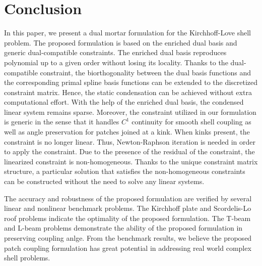 \section{Conclusion}\label{sec:conlusion}
In this paper, we present a dual mortar formulation for the Kirchhoff-Love shell problem. The proposed formulation is based on the enriched \Bezier dual basis and generic dual-compatible constraints. The enriched \Bezier dual basis reproduces polynomial up to a given order without losing its locality. Thanks to the dual-compatible constraint, the biorthogonality between the dual basis functions and the corresponding primal spline basis functions can be extended to the discretized constraint matrix. Hence, the static condensation can be achieved without extra computational effort. With the help of the enriched \Bezier dual basis, the condensed linear system remains sparse. Moreover, the constraint utilized in our formulation is generic in the sense that it handles $C^1$ continuity for smooth shell coupling as well as angle preservation for patches joined at a kink. When kinks present, the constraint is no longer linear. Thus, Newton-Raphson iteration is needed in order to apply the constraint. Due to the presence of the residual of the constraint, the linearized constraint is non-homogeneous. Thanks to the unique constraint matrix structure, a particular solution that satisfies the non-homogeneous constraints can be constructed without the need to solve any linear systems. \par

The accuracy and robustness of the proposed formulation are verified by several linear and nonlinear benchmark problems. The Kirchhoff plate and Scordelis-Lo roof problems indicate the optimality of the proposed formulation. The T-beam and L-beam problems demonstrate the ability of the proposed formulation in preserving coupling anlge. From the benchmark results, we believe the proposed patch coupling formulation has great potential in addressing real world complex shell problems.